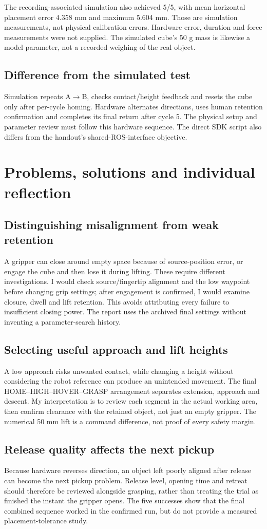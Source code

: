 The recording-associated simulation also achieved 5/5, with mean horizontal placement error 4.358 mm and maximum 5.604 mm. Those are simulation measurements, not physical calibration errors. Hardware error, duration and force measurements were not supplied. The simulated cube's 50 g mass is likewise a model parameter, not a recorded weighing of the real object.
\subsection{Difference from the simulated test}
Simulation repeats A$\rightarrow$B, checks contact/height feedback and resets the cube only after per-cycle homing. Hardware alternates directions, uses human retention confirmation and completes its final return after cycle 5. The physical setup and parameter review must follow this hardware sequence. The direct SDK script also differs from the handout's shared-ROS-interface objective.
\clearpage
\section{Problems, solutions and individual reflection}
\subsection{Distinguishing misalignment from weak retention}
A gripper can close around empty space because of source-position error, or engage the cube and then lose it during lifting. These require different investigations. I would check source/fingertip alignment and the low waypoint before changing grip settings; after engagement is confirmed, I would examine closure, dwell and lift retention. This avoids attributing every failure to insufficient closing power. The report uses the archived final settings without inventing a parameter-search history.
\subsection{Selecting useful approach and lift heights}
A low approach risks unwanted contact, while changing a height without considering the robot reference can produce an unintended movement. The final HOME--HIGH--HOVER--GRASP arrangement separates extension, approach and descent. My interpretation is to review each segment in the actual working area, then confirm clearance with the retained object, not just an empty gripper. The numerical 50 mm lift is a command difference, not proof of every safety margin.
\subsection{Release quality affects the next pickup}
Because hardware reverses direction, an object left poorly aligned after release can become the next pickup problem. Release level, opening time and retreat should therefore be reviewed alongside grasping, rather than treating the trial as finished the instant the gripper opens. The five successes show that the final combined sequence worked in the confirmed run, but do not provide a measured placement-tolerance study.
